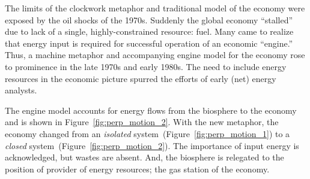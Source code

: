 %
%


The limits of the clockwork metaphor and traditional model of the economy were 
exposed by the oil shocks of the 1970s.
Suddenly the global economy
``stalled'' due to lack of 
a single, highly-constrained resource:
fuel.
Many came to realize that energy input is required
for successful operation of an economic ``engine.''
Thus, a machine metaphor and 
accompanying engine model for the economy 
rose to prominence
in the late 1970s and early 1980s.
The need to include energy resources
in the economic picture
spurred the efforts of early (net) energy 
analysts.\cite{Gilliland1975, Chapman1976}

The engine model accounts for energy flows from the biosphere 
to the economy and is shown in Figure~\ref{fig:perp_motion_2}.
With the new metaphor, the economy changed from 
an \emph{isolated} system~(Figure~\ref{fig:perp_motion_1}) to 
a \emph{closed} system~(Figure~\ref{fig:perp_motion_2}). 
The importance of input energy is acknowledged, 
but wastes are absent.
And, the biosphere is relegated to the position
of provider of energy resources;
the gas station of the economy.\cite{Norgaard2010}

